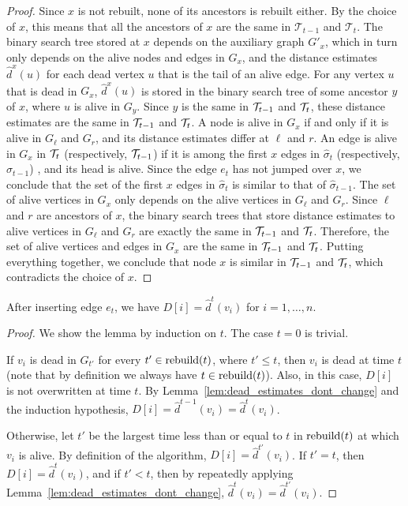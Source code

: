 \begin{proof}
    Since $x$ is not rebuilt, none of its ancestors is rebuilt either. By the choice of $x$, this means that all the ancestors of $x$ are the same in $\mathcal{T}_{t-1}$ and $\mathcal{T}_t$.
    The binary search tree stored at $x$ depends on the auxiliary graph $G'_x$, which in turn only depends on the alive nodes and edges in $G_x$, and the distance estimates $\hat{d}^x(u)$ for each dead vertex $u$ that is the tail of an alive edge. 
    For any vertex $u$ that is dead in $G_x$, $\hat{d}^x(u)$ is stored in the binary search tree of some ancestor $y$ of $x$, where $u$ is alive in $G_y$. 
    Since $y$ is the same in $\mathcal{T}_{t-1}$ and $\mathcal{T}_t$, these distance estimates are the same in $\mathcal{T}_{t-1}$ and $\mathcal{T}_t$.
    A node is alive in $G_x$ if and only if it is alive in $G_\ell$ and $G_r$, and its distance estimates differ at $\ell$ and $r$. 
    An edge is alive in $G_x$ in $\mathcal{T}_t$ (respectively, $\mathcal{T}_{t-1}$) if it is among the first $x$ edges in $\hat{\sigma}_t$ (respectively, $\hat{\sigma}_{t-1}$) , and its head is alive. 
    Since the edge $e_t$ has not jumped over $x$, we conclude that the set of the first $x$ edges in $\hat{\sigma}_t$ is similar to that of $\hat{\sigma}_{t-1}$.
    The set of alive vertices in $G_x$ only depends on the alive vertices in $G_\ell$ and $G_r$. Since $\ell$ and $r$ are ancestors of $x$, the binary search trees that store distance estimates to alive vertices in $G_\ell$ and $G_r$ are exactly the same in $\mathcal{T}_{t-1}$ and $\mathcal{T}_t$.
    Therefore, the set of alive vertices and edges in $G_x$ are the same in $\mathcal{T}_{t-1}$ and $\mathcal{T}_t$. 
    Putting everything together, we conclude that node $x$ is similar in $\mathcal{T}_{t-1}$ and $\mathcal{T}_t$, which contradicts the choice of $x$.  
\end{proof}

\begin{lemma}
\label{lem:D}
    After inserting edge $e_t$, we have $D[i] = \hat{d}^t(v_i)$ for $i=1,\ldots,n$.
\end{lemma}

\begin{proof}
    We show the lemma by induction on $t$. The case $t = 0$ is trivial. 
        
    If $v_i$ is dead in $G_{t'}$ for every $t'\in \text{rebuild}(t)$, where $t' \leq t$, then $v_i$ is dead at time $t$ (note that by definition we always have $t \in \text{rebuild}(t)$).
    Also, in this case, $D[i]$ is not overwritten at time $t$. By Lemma~\ref{lem:dead_estimates_dont_change} and the induction hypothesis, $D[i] = \hat{d}^{t-1}(v_i) = \hat{d}^t(v_i)$. 

    Otherwise, let $t'$ be the largest time less than or equal to $t$ in $\text{rebuild}(t)$ at which $v_i$ is alive.  By definition of the algorithm, $D[i] = \hat{d}^{t'}(v_i)$.
    If $t' = t$, then $D[i] = \hat{d}^{t}(v_i)$, and if $t' < t$, then by repeatedly applying Lemma~\ref{lem:dead_estimates_dont_change}, $\hat{d}^t(v_i) = \hat{d}^{t'}(v_i)$.
\end{proof}

